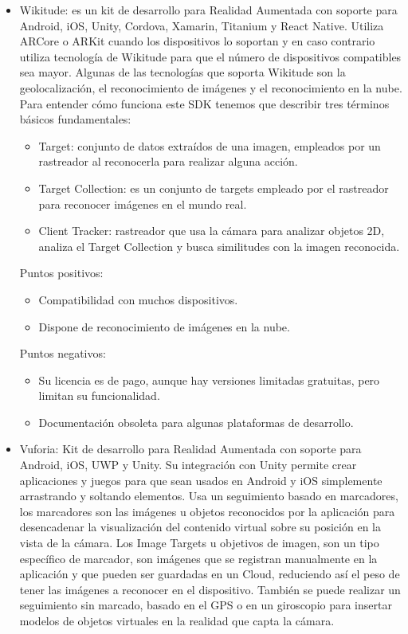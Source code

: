 \begin{itemize}
    \item Wikitude\cite{wikitude}:
    es un kit de desarrollo para Realidad Aumentada con soporte para Android,
    iOS, Unity, Cordova, Xamarin, Titanium y React Native.
    Utiliza ARCore o ARKit cuando los dispositivos lo soportan y en caso
    contrario utiliza tecnología de Wikitude para que el número de dispositivos
    compatibles sea mayor. Algunas de las tecnologías que soporta Wikitude son
    la geolocalización, el reconocimiento de imágenes y el reconocimiento en la
    nube. Para entender cómo funciona este SDK tenemos que describir tres
    términos básicos fundamentales:
    \begin{itemize}
        \item Target: conjunto de datos extraídos de una imagen, empleados por
        un rastreador al reconocerla para realizar alguna acción.
        \item Target Collection: es un conjunto de targets empleado por el
        rastreador para reconocer imágenes en el mundo real.
        \item Client Tracker: rastreador que usa la cámara para analizar objetos
        2D, analiza el Target Collection y busca similitudes con la imagen
        reconocida.
    \end{itemize}

    Puntos positivos:
    \begin{itemize}
        \item Compatibilidad con muchos dispositivos.
        \item Dispone de reconocimiento de imágenes en la nube.
    \end{itemize}
    Puntos negativos:
    \begin{itemize}
        \item Su licencia es de pago, aunque hay versiones limitadas gratuitas,
        pero limitan su funcionalidad.
        \item Documentación obsoleta para algunas plataformas de desarrollo.
    \end{itemize}


    \item Vuforia\cite{vuforia}:
    Kit de desarrollo para Realidad Aumentada con soporte para Android, iOS,
    UWP y Unity.
    Su integración con Unity permite crear aplicaciones y juegos 
    para que sean usados en Android y iOS simplemente arrastrando y soltando
    elementos. Usa un seguimiento basado en marcadores, los marcadores son las
    imágenes u objetos reconocidos por la aplicación para desencadenar la
    visualización del contenido virtual sobre su posición en la vista de la
    cámara.
    Los Image Targets u objetivos de imagen, son un tipo específico de marcador,
    son imágenes que se registran manualmente en la aplicación y que pueden ser
    guardadas en un Cloud, reduciendo así el peso de tener las imágenes a
    reconocer en el dispositivo.
    También se puede realizar un seguimiento sin marcado, basado en el GPS o en
    un giroscopio para insertar modelos de objetos virtuales en la realidad que
    capta la cámara.


\end{itemize}
